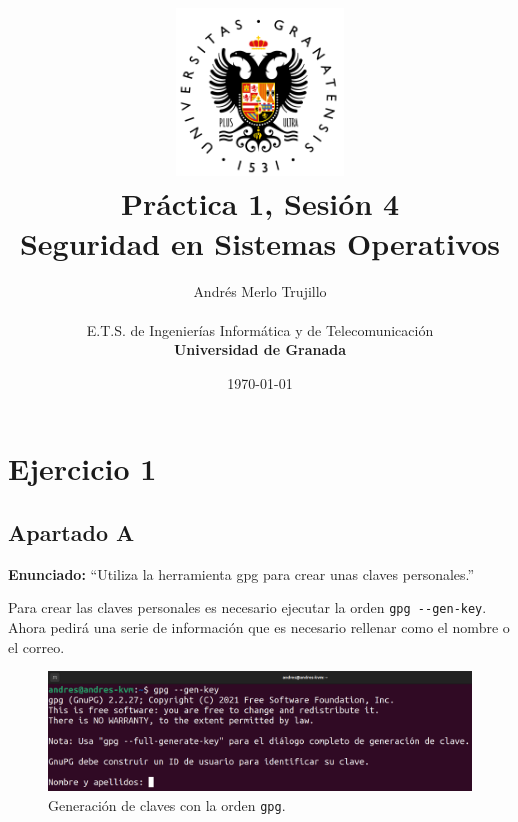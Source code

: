 \documentclass{article}
\title{
\includegraphics[width=1.75in]{imagenes/UGR-Logo.png} \\
\vspace*{1in}
\textbf{Práctica 1, Sesión 4} \\
Seguridad en Sistemas Operativos \\
\vspace*{0.5in}}
\author{Andrés Merlo Trujillo \\
\vspace*{0.5in} \\
E.T.S. de Ingenierías Informática y de Telecomunicación \\
\textbf{Universidad de Granada}} \date{\today}
\begin{document}
\begin{titlingpage}
    \maketitle
\end{titlingpage}

\tableofcontents

\newpage

\pagestyle{fancy}
{}
\section*{Ejercicio 1}

{}
\subsection*{Apartado A}

\textbf{Enunciado: }``Utiliza la herramienta gpg para crear unas claves personales.''

\bigskip

Para crear las claves personales es necesario ejecutar la orden \verb|gpg --gen-key|. Ahora pedirá una serie de información que es necesario rellenar como el nombre o el correo.

\begin{figure}[H]
    \includegraphics[width=\textwidth]{imagenes/Captura desde 2022-10-19 16-42-45.png}
    \caption{Generación de claves con la orden \texttt{gpg}.}
\end{figure}
\end{document}
